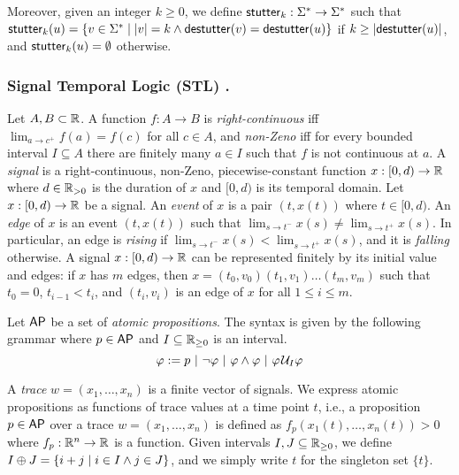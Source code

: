 Moreover, given an integer $k \geq 0$, we define $\mathsf{stutter}_k : \Sigma^* \to \Sigma^*$ such that $\stutter_k(u) = \{v \in \Sigma^* \st |v| = k \land \destutter(v) = \destutter(u)\}$ if $k \geq |\mathsf{destutter}(u)|$, and $\mathsf{stutter}_k(u) = \emptyset$ otherwise.

\subsubsection{Signal Temporal Logic (STL) \cite{MalerN13}.} \label{sec:stl}

Let $A,B \subset \mathbb{R}$.
%
A function $f : A \to B$ is
\emph{right-continuous} iff $\lim_{a \to c^+} f(a) = f(c)$ for all $c \in A$, and
\emph{non-Zeno} iff for every bounded interval $I \subseteq A$ there are finitely many $a \in I$ such that $f$ is not continuous at $a$.
%
A \emph{signal} is a right-continuous, non-Zeno, piecewise-constant function $x : [0,d) \to \mathbb{R}$ where $d \in \mathbb{R}_{> 0}$ is the duration of $x$ and $[0,d)$ is its temporal domain.
Let $x : [0,d) \to \mathbb{R}$ be a signal.
An \emph{event} of $x$ is a pair $(t, x(t))$ where $t \in [0,d)$.
An \emph{edge} of $x$ is an event $(t, x(t))$ such that $\lim_{s \to t^-} x(s) \neq \lim_{s \to t^+} x(s)$.
In particular, an edge is \emph{rising} if $\lim_{s \to t^-} x(s) < \lim_{s \to t^+} x(s)$, and it is \emph{falling} otherwise.
A signal $x : [0,d) \to \mathbb{R}$ can be represented finitely by its initial value and edges: if $x$ has $m$ edges, then $x = (t_0, v_0) (t_1, v_1) \ldots (t_m, v_m)$ such that $t_0 = 0$, $t_{i-1} < t_i$, and $(t_i, v_i)$ is an edge of $x$ for all $1 \leq i \leq m$.

Let $\mathsf{AP}$ be a set of \emph{atomic propositions}.
The syntax is given by the following grammar where $p \in \mathsf{AP}$ and $I \subseteq \mathbb{R}_{\geq 0}$ is an interval.
\[ \varphi :=  p ~|~ \lnot \varphi ~|~ \varphi \land \varphi ~|~ \varphi \kern.1em\mathcal{U}_I \varphi \]

A \emph{trace} $w = (x_1, \ldots, x_n)$ is a finite vector of signals.
We express atomic propositions as functions of trace values at a time point $t$,
i.e., a proposition $p \in \mathsf{AP}$ over a trace $w = (x_1, \ldots, x_n)$ is defined as $f_p(x_1(t), \ldots, x_n(t)) > 0$ where $f_p : \mathbb{R}^n \to \mathbb{R}$ is a function.
Given intervals $I,J \subseteq \mathbb{R}_{\geq 0}$, we define $I \oplus J = \{i + j \st i \in I \land j \in J\}$, and we simply write $t$ for the singleton set $\{t\}$. 

